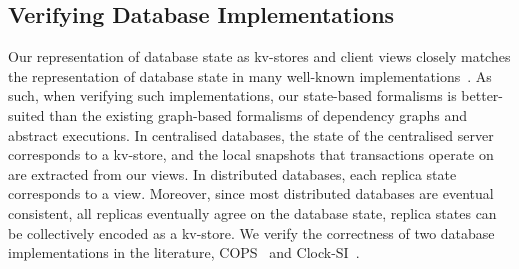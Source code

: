 \subsection{Verifying Database Implementations}
\label{sec:verify-impl}
%
Our representation of database state as kv-stores and client views closely matches the representation of database state in many well-known implementations~\cite{??}.
As such, when verifying such implementations, our state-based formalisms is better-suited than the existing graph-based formalisms of dependency graphs and abstract executions. 
In centralised databases, the state of the centralised server corresponds to a kv-store,
and the local snapshots that transactions operate on are extracted from our views.  
In distributed databases, each replica state corresponds to a view. 
Moreover, since most distributed databases are eventual consistent, 
\ie all replicas eventually agree on the database state,
replica states can be collectively encoded as a kv-store.
We verify the correctness of two database implementations in the literature,
COPS~\cite{Lloyd:2011:DSE:2043556.2043593} and Clock-SI~\cite{Du:2013:CSI:2553409.2553434}.

